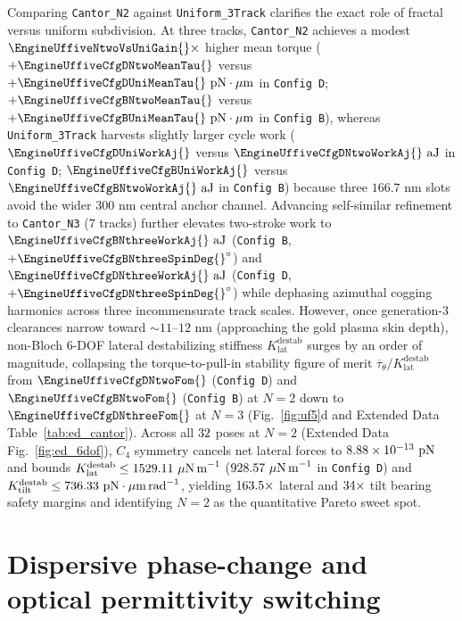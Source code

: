 \documentclass[11pt,a4paper]{article}
\begin{document}
Comparing \texttt{Cantor\_N2} against \texttt{Uniform\_3Track} clarifies the exact role of fractal versus uniform subdivision. At three tracks, \texttt{Cantor\_N2} achieves a modest $\EngineUffiveNtwoVsUniGain{}\times$ higher mean torque ($+\EngineUffiveCfgDNtwoMeanTau{}$ versus $+\EngineUffiveCfgDUniMeanTau{}\text{ pN}\cdot\mu\text{m}$ in \texttt{Config D}; $+\EngineUffiveCfgBNtwoMeanTau{}$ versus $+\EngineUffiveCfgBUniMeanTau{}\text{ pN}\cdot\mu\text{m}$ in \texttt{Config B}), whereas \texttt{Uniform\_3Track} harvests slightly larger cycle work ($\EngineUffiveCfgDUniWorkAj{}$ versus $\EngineUffiveCfgDNtwoWorkAj{}\text{ aJ}$ in \texttt{Config D}; $\EngineUffiveCfgBUniWorkAj{}$ versus $\EngineUffiveCfgBNtwoWorkAj{}\text{ aJ}$ in \texttt{Config B}) because three $166.7\text{ nm}$ slots avoid the wider $300\text{ nm}$ central anchor channel. Advancing self-similar refinement to \texttt{Cantor\_N3} ($7$ tracks) further elevates two-stroke work to $\EngineUffiveCfgBNthreeWorkAj{}\text{ aJ}$ (\texttt{Config B}, $+\EngineUffiveCfgBNthreeSpinDeg{}^\circ$) and $\EngineUffiveCfgDNthreeWorkAj{}\text{ aJ}$ (\texttt{Config D}, $+\EngineUffiveCfgDNthreeSpinDeg{}^\circ$) while dephasing azimuthal cogging harmonics across three incommensurate track scales. However, once generation-3 clearances narrow toward $\sim 11\text{--}12\text{ nm}$ (approaching the gold plasma skin depth), non-Bloch 6-DOF lateral destabilizing stiffness $K_{\mathrm{lat}}^{\mathrm{destab}}$ surges by an order of magnitude, collapsing the torque-to-pull-in stability figure of merit $\overline{\tau}_\theta / K_{\mathrm{lat}}^{\mathrm{destab}}$ from $\EngineUffiveCfgDNtwoFom{}$ (\texttt{Config D}) and $\EngineUffiveCfgBNtwoFom{}$ (\texttt{Config B}) at $N=2$ down to $\EngineUffiveCfgDNthreeFom{}$ at $N=3$ (Fig.~\ref{fig:uf5}d and Extended Data Table~\ref{tab:ed_cantor}). Across all $32{}$ poses at $N=2$ (Extended Data Fig.~\ref{fig:ed_6dof}), $C_4$ symmetry cancels net lateral forces to $8.88 \times 10^{-13}{}\text{ pN}$ and bounds $K_{\mathrm{lat}}^{\mathrm{destab}} \le 1529.11{}\ \mu\text{N\,m}^{-1}$ ($\EngineUffourCfgDMaxKLatUnM{}\ \mu\text{N\,m}^{-1}$ in \texttt{Config D}) and $K_{\mathrm{tilt}}^{\mathrm{destab}} \le 736.33{}\text{ pN}\cdot\mu\text{m\,rad}^{-1}$, yielding $163.5{}\times$ lateral and $34{}\times$ tilt bearing safety margins and identifying $N=2$ as the quantitative Pareto sweet spot.

\section*{Dispersive phase-change and optical permittivity switching}
\end{document}
